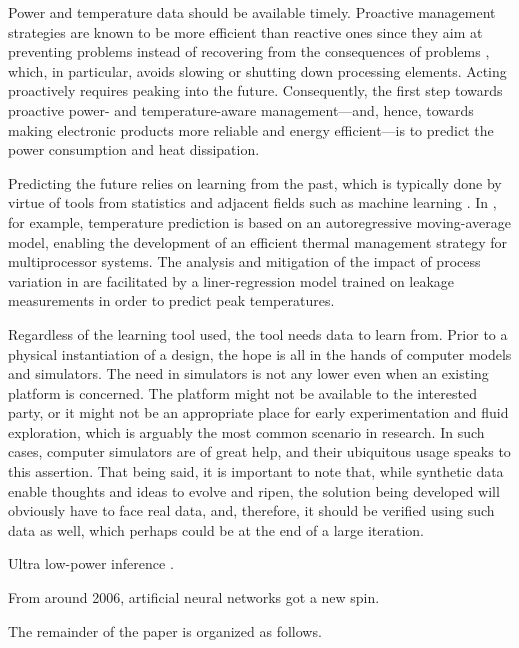 Power and temperature data should be available timely. Proactive management
strategies are known to be more efficient than reactive ones since they aim at
preventing problems instead of recovering from the consequences of problems
\cite{coskun2008, chaudhry2015}, which, in particular, avoids slowing or
shutting down processing elements. Acting proactively requires peaking into the
future. Consequently, the first step towards proactive power- and
temperature-aware management---and, hence, towards making electronic products
more reliable and energy efficient---is to predict the power consumption and
heat dissipation.

Predicting the future relies on learning from the past, which is typically done
by virtue of tools from statistics and adjacent fields such as machine learning
\cite{bishop2006}. In \cite{coskun2008}, for example, temperature prediction is
based on an autoregressive moving-average model, enabling the development of an
efficient thermal management strategy for multiprocessor systems. The analysis
and mitigation of the impact of process variation in \cite{juan2014} are
facilitated by a liner-regression model trained on leakage measurements in order
to predict peak temperatures.

Regardless of the learning tool used, the tool needs data to learn from. Prior
to a physical instantiation of a design, the hope is all in the hands of
computer models and simulators. The need in simulators is not any lower even
when an existing platform is concerned. The platform might not be available to
the interested party, or it might not be an appropriate place for early
experimentation and fluid exploration, which is arguably the most common
scenario in research. In such cases, computer simulators are of great help, and
their ubiquitous usage speaks to this assertion. That being said, it is
important to note that, while synthetic data enable thoughts and ideas to evolve
and ripen, the solution being developed will obviously have to face real data,
and, therefore, it should be verified using such data as well, which perhaps
could be at the end of a large iteration.

Ultra low-power inference \cite{park2015}.

From around 2006, artificial neural networks got a new spin.

The remainder of the paper is organized as follows.
